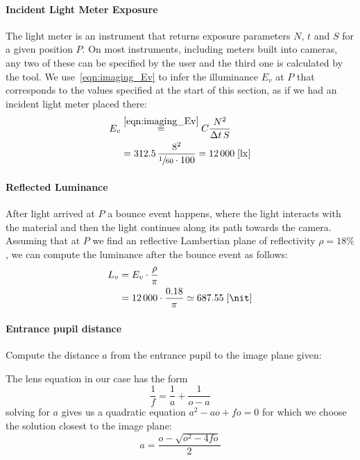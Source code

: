 \paragraph{Incident Light Meter Exposure}
The light meter is an instrument that returns exposure parameters $N$, $t$ and $S$ for a given
position $P$. On most instruments, including meters built into cameras, any two of these can be  
specified by the user and the third one is calculated by the tool.
We use~\cref{eqn:imaging_Ev} to infer the illuminance $E_v$ at $P$ that corresponds to the 
values specified at the start of this section, as if we had an incident light meter placed there:
\begin{align*}
E_v& \stackrel{\eqref{eqn:imaging_Ev}}{=} C\frac{N^2}{\Delta t\, S}\\
&= 312.5\,\frac{8^2}{\sfrac{1}{60}\cdot 100} = \num{12000}\;[\unit{\lux}]
\end{align*}

\paragraph{Reflected Luminance}
After light arrived at $P$ a bounce event happens, where the light interacts with the material
and then the light continues along its path towards the camera.
Assuming that at $P$ we find an reflective Lambertian plane of reflectivity $\rho = 18\%$, we
can compute the luminance after the bounce event as follows:
\begin{align*}
L_v& = E_v\cdot \frac{\rho}{\pi} \\
&= \num{12000} \cdot \frac{0.18}{\pi}
\simeq \num{687.55}\;[\unit{\nit}]
\end{align*}


\paragraph{Entrance pupil distance}
Compute the distance $a$ from the entrance pupil to the image plane given:

The lens equation in our case has the form
\begin{displaymath}
\frac1f = \frac1a + \frac1{o - a}
\end{displaymath}
solving for $a$ gives us a quadratic equation $a^2 - a o + f o = 0$ for which we
choose the solution closest to the image plane:
\begin{displaymath}
a = \frac{o-\sqrt{o^2 - 4fo}}2
\end{displaymath}


